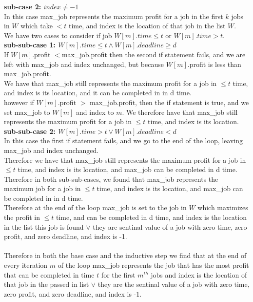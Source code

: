 \documentclass{article}
\begin{document}
        \textbf{sub-case 2: $index \neq -1$}\\
        \indent In this case max\_job represents the maximum profit for a job in the first $k$ jobs in $W$ which take $< t$ time, and index is the location of that job in the list $W$.\\
        \indent We have two cases to consider if job $W[m].time \leq t$ or $W[m].time > t$.\\
        \indent \textbf{sub-sub-case 1: $W[m].time \leq t \land W[m].deadline \geq d$}\\
        \indent \indent If $W[m]$.profit $< $max\_job.profit then the second if statement fails, and we are left with max\_job and index unchanged, but because $W[m]$.profit is less than max\_job.profit.\\
        \indent \indent We have that max\_job still represents the maximum profit for a job in $\leq t$ time, and index is its location, and it can be completed in in d time.\\
        \indent \indent however if $W[m]$.profit $>$ max\_job.profit, then the if statement is true, and we set max\_job to $W[m]$ and index to $m$.
        \indent \indent We therefore have that max\_job still represents the maximum profit for a job in $\leq t$ time, and index is its location.\\
        \indent \textbf{sub-sub-case 2: $W[m].time > t \lor W[m].deadline < d$}\\
        \indent \indent In this case the first if statement fails, and we go to the end of the loop, leaving max\_job and index unchanged.\\
        \indent \indent Therefore we have that max\_job still represents the maximum profit for a job in $\leq t$ time, and index is its location, and max\_job can be completed in d time.\\
        \indent Therefore in both sub-sub-cases, we found that max\_job represents the maximum job for a job in $\leq t$ time, and index is its location, and max\_job can be completed in in d time.\\
        \indent Therefore at the end of the loop max\_job is set to the job in $W$ which maximizes the profit in $\leq t$ time, and can be completed in d time, and index is the location in the list this job is found $\lor$ they are sentinal value of a job with zero time, zero profit, and zero deadline, and index is -1.\\
        \\
        Therefore in both the base case and the inductive step we find that at the end of every iteration $m$ of the loop max\_job represents the job that has the most profit that can be completed in time $t$ for the first $m^{th}$ jobs and index is the location of that job in the passed in list $\lor$ they are the sentinal value of a job with zero time, zero profit, and zero deadline, and index is -1.\\
\end{document}
